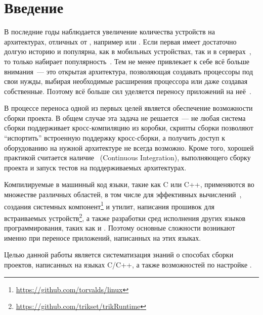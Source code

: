 
\section*{Введение}
\thispagestyle{withCompileDate}

В последние годы наблюдается увеличение количества устройств на архитектурах, отличных от \amd{}, например \arm{} или \riscv{}.
Если первая имеет достаточно долгую историю и популярна, как в мобильных устройствах, так и в серверах~\cite{aleksandarkChinaHosts402023}, то \riscv{} только набирает популярность~\cite{sperlingRISCVPushesMainstream2022}.
Тем не менее \riscv{} привлекает к себе всё больше внимания~--- это открытая архитектура, позволяющая создавать процессоры под свои нужды, выбирая необходимые расширения процессора или даже создавая собственные.
Поэтому всё больше сил уделяется переносу приложений на неё~\cite{ducassePortingJITCompiler2022,newsHowAlibabaPorting,mcgrewPortingNetBSDRISCV}.

В процессе переноса одной из первых целей является обеспечение возможности сборки проекта.
В общем случае эта задача не решается~--- не любая система сборки поддерживает кросс-компиляцию из коробки, скрипты сборки позволяют \enquote{испортить} встроенную поддержку кросс-сборки, а получить доступ к оборудованию на нужной архитектуре не всегда возможно.
Кроме того, хорошей практикой считается наличие \ci{}~(Continuous Integration), выполняющего сборку проекта и запуск тестов на поддерживаемых архитектурах.

Компилируемые в машинный код языки, такие как \textsc{C} или \textsc{C++}, применяются во множестве различных областей, в том числе для эффективных вычислений~\cite{davisAlgorithm1000SuiteSparse2019}, создания системных компонент\footnote{\url{https://github.com/torvalds/linux}} и утилит, написания прошивок для встраиваемых устройств\footnote{\url{https://github.com/trikset/trikRuntime}}, а также разработки сред исполнения других языков программирования, таких как \dotnet{} и \java{}.
Поэтому основные сложности возникают именно при переносе приложений, написанных на этих языках.

Целью данной работы является систематизация знаний о способах сборки проектов, написанных на языках \textsc{C}/\textsc{C++}, а также возможностей по настройке \ci{}.
